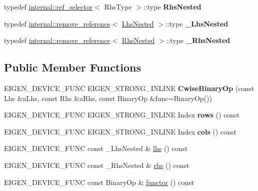 \begin{DoxyCompactItemize}
typedef \mbox{\hyperlink{struct_eigen_1_1internal_1_1ref__selector}{internal\+::ref\+\_\+selector}}$<$ Rhs\+Type $>$\+::type {\bfseries Rhs\+Nested}
\item 
\mbox{\label{class_eigen_1_1_cwise_binary_op_a138c1d4de02672e0413e00740cea9fb2}} 
typedef \mbox{\hyperlink{struct_eigen_1_1internal_1_1remove__reference}{internal\+::remove\+\_\+reference}}$<$ \mbox{\hyperlink{struct_eigen_1_1internal_1_1true__type}{Lhs\+Nested}} $>$\+::type {\bfseries \+\_\+\+Lhs\+Nested}
\item 
\mbox{\label{class_eigen_1_1_cwise_binary_op_aa7ac1eae125b261a3fe9c4cc610a1fab}} 
typedef \mbox{\hyperlink{struct_eigen_1_1internal_1_1remove__reference}{internal\+::remove\+\_\+reference}}$<$ \mbox{\hyperlink{struct_eigen_1_1internal_1_1true__type}{Rhs\+Nested}} $>$\+::type {\bfseries \+\_\+\+Rhs\+Nested}
\end{DoxyCompactItemize}
\subsection*{Public Member Functions}
\begin{DoxyCompactItemize}
\item 
\mbox{\label{class_eigen_1_1_cwise_binary_op_a2eddd2a280221cee4e42ac6fbed64ad1}} 
E\+I\+G\+E\+N\+\_\+\+D\+E\+V\+I\+C\+E\+\_\+\+F\+U\+NC E\+I\+G\+E\+N\+\_\+\+S\+T\+R\+O\+N\+G\+\_\+\+I\+N\+L\+I\+NE {\bfseries Cwise\+Binary\+Op} (const Lhs \&a\+Lhs, const Rhs \&a\+Rhs, const Binary\+Op \&func=Binary\+Op())
\item 
\mbox{\label{class_eigen_1_1_cwise_binary_op_ab34abef7299679708c9311ae9044dc8e}} 
E\+I\+G\+E\+N\+\_\+\+D\+E\+V\+I\+C\+E\+\_\+\+F\+U\+NC E\+I\+G\+E\+N\+\_\+\+S\+T\+R\+O\+N\+G\+\_\+\+I\+N\+L\+I\+NE Index {\bfseries rows} () const
\item 
\mbox{\label{class_eigen_1_1_cwise_binary_op_aa9542897bb422929bc2223b761450304}} 
E\+I\+G\+E\+N\+\_\+\+D\+E\+V\+I\+C\+E\+\_\+\+F\+U\+NC E\+I\+G\+E\+N\+\_\+\+S\+T\+R\+O\+N\+G\+\_\+\+I\+N\+L\+I\+NE Index {\bfseries cols} () const
\item 
E\+I\+G\+E\+N\+\_\+\+D\+E\+V\+I\+C\+E\+\_\+\+F\+U\+NC const \+\_\+\+Lhs\+Nested \& \mbox{\hyperlink{class_eigen_1_1_cwise_binary_op_a0f73e7585dfb54d41c1983e1e6a4b269}{lhs}} () const
\item 
E\+I\+G\+E\+N\+\_\+\+D\+E\+V\+I\+C\+E\+\_\+\+F\+U\+NC const \+\_\+\+Rhs\+Nested \& \mbox{\hyperlink{class_eigen_1_1_cwise_binary_op_a3a61cbdf6d1adaa62f012045b04b6d09}{rhs}} () const
\item 
E\+I\+G\+E\+N\+\_\+\+D\+E\+V\+I\+C\+E\+\_\+\+F\+U\+NC const Binary\+Op \& \mbox{\hyperlink{class_eigen_1_1_cwise_binary_op_acc4efe306adbdc0c95cc1c73a8cf81e4}{functor}} () const
\end{DoxyCompactItemize}
